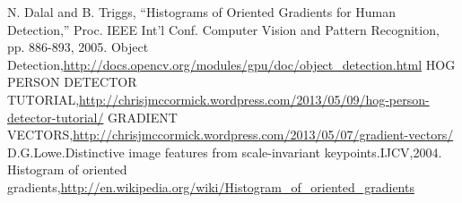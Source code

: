\documentclass[10pt,technote,onecolumn,twoside]{IEEEtran}
\begin{document}




\begin{thebibliography}{99}
N. Dalal and B. Triggs, “Histograms of Oriented Gradients for
Human Detection,” Proc. IEEE Int’l Conf. Computer Vision and
Pattern Recognition, pp. 886-893, 2005.
Object Detection,\url{http://docs.opencv.org/modules/gpu/doc/object_detection.html}
HOG PERSON DETECTOR TUTORIAL,\url{http://chrisjmccormick.wordpress.com/2013/05/09/hog-person-detector-tutorial/}
GRADIENT VECTORS,\url{http://chrisjmccormick.wordpress.com/2013/05/07/gradient-vectors/}
D.G.Lowe.Distinctive image features from scale-invariant keypoints.IJCV,2004.
Histogram of oriented gradients,\url{http://en.wikipedia.org/wiki/Histogram_of_oriented_gradients}
\end{thebibliography}
%
\end{document}
